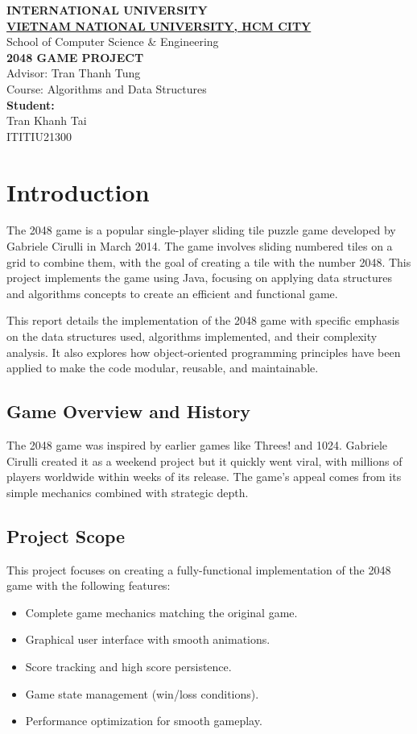 \documentclass[12pt, a4paper]{article}
\newcommand{\titlepagetext}{
  \vspace*{1cm}
  \begin{center}
    {\Large\bfseries\textcolor{navyblue}{INTERNATIONAL UNIVERSITY}}\\[0.3cm]
    {\Large\bfseries\textcolor{navyblue}{\underline{VIETNAM NATIONAL UNIVERSITY, HCM CITY}}}\\[1cm]
    {\large\textcolor{navyblue}{School of Computer Science \& Engineering}}\\[2cm]
    
    {\LARGE\bfseries\textcolor{titlered}{2048 GAME PROJECT}}\\[2cm]
    
    {\large\textcolor{navyblue}{Advisor: Tran Thanh Tung}}\\[0.5cm]
    {\large\textcolor{navyblue}{Course: Algorithms and Data Structures}}\\[2cm]
    
    \large\textbf{\textcolor{navyblue}{Student:}}\\[1cm]
    \large\textcolor{navyblue}{Tran Khanh Tai}\\
    \large\textcolor{navyblue}{ITITIU21300}\\[1cm]
  \end{center}
}
\begin{document}
\begin{titlepage}
\thispagestyle{empty} %

\vspace{2cm}

\titlepagetext

\end{titlepage}

\tableofcontents
\clearpage

\listoftables
\clearpage

\listofcodeexample
\clearpage

\section{Introduction}
The 2048 game is a popular single-player sliding tile puzzle game developed by Gabriele Cirulli in March 2014. The game involves sliding numbered tiles on a grid to combine them, with the goal of creating a tile with the number 2048. This project implements the game using Java, focusing on applying data structures and algorithms concepts to create an efficient and functional game.

This report details the implementation of the 2048 game with specific emphasis on the data structures used, algorithms implemented, and their complexity analysis. It also explores how object-oriented programming principles have been applied to make the code modular, reusable, and maintainable.

\subsection{Game Overview and History}
The 2048 game was inspired by earlier games like Threes! and 1024. Gabriele Cirulli created it as a weekend project but it quickly went viral, with millions of players worldwide within weeks of its release. The game's appeal comes from its simple mechanics combined with strategic depth.

\subsection{Project Scope}
This project focuses on creating a fully-functional implementation of the 2048 game with the following features:
\begin{itemize}
    \item Complete game mechanics matching the original game.
    \item Graphical user interface with smooth animations.
    \item Score tracking and high score persistence.
    \item Game state management (win/loss conditions).
    \item Performance optimization for smooth gameplay.
\end{itemize}
\end{document}
